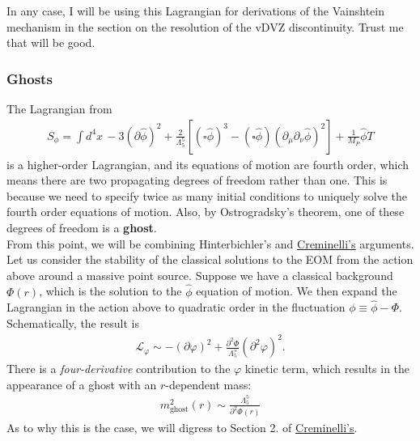 \documentclass{book}
\theoremstyle{definition}
\newcommand{\p}{\partial}
\newcommand{\lag}{\mathcal{L}}
\newcommand{\f}[2]{\frac{#1}{#2}}
\begin{document}
In any case, I will be using this Lagrangian for derivations of the Vainshtein mechanism in the section on the resolution of the vDVZ discontinuity. Trust me that will be good.
 

































\newpage

\subsubsection{Ghosts}

The Lagrangian from 
\begin{align}
\boxed{S_\phi = \int d^4x\, -3(\p \hat{\phi})^2 + \f{2}{\Lambda_5^5}[(\square \hat\phi)^3 - (\square \hat\phi)(\p_\mu \p_\nu \hat\phi)^2] + \f{1}{M_P}\hat\phi T}
\end{align}
is a higher-order Lagrangian, and its equations of motion are fourth order, which means there are two propagating degrees of freedom rather than one. This is because we need to specify twice as many initial conditions to uniquely solve the fourth order equations of motion. Also, by Ostrogradsky's theorem, one of these degrees of freedom is a \textbf{ghost}.  \\

From this point, we will be combining Hinterbichler's and \href{https://arxiv.org/pdf/hep-th/0505147.pdf}{\underline{Creminelli's}} arguments. Let us consider the stability of the classical solutions to the EOM from the action above around a massive point source. Suppose we have a classical background $\Phi(r)$, which is the solution to the $\hat\phi$ equation of motion. We then expand the Lagrangian in the action above to quadratic order in the fluctuation $\boxed{\phi \equiv \hat\phi - \Phi}$.  Schematically, the result is 
\begin{align}
\lag_\varphi \sim -(\p \varphi)^2 + \f{\p^2 \Phi}{\Lambda_5^5}(\p^2 \varphi)^2.
\end{align}
There is a \textit{four-derivative} contribution to the $\varphi$ kinetic term, which results in the appearance of a ghost with an $r$-dependent mass:
\begin{align}
\boxed{m^2_{\text{ghost}}(r) \sim \f{\Lambda_5^5}{\p^2 \Phi(r)}}
\end{align}
As to why this is the case, we will digress to Section 2. of \href{https://arxiv.org/pdf/hep-th/0505147.pdf}{\underline{Creminelli's}}.\\
\end{document}
